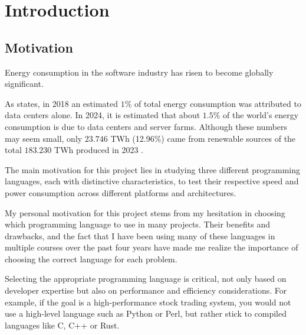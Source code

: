 \chapter{Introduction}\label{chap:introduction}



\section{Motivation}\label{sec:motivation}
Energy consumption in the software industry has risen to become globally significant. %

As \cite{recalibrating-datacenter} states, in 2018 an estimated $1\%$ of total energy consumption was attributed to data centers alone. In 2024, it is estimated that about $1.5\%$ of the world's energy consumption is due to data centers and server farms. Although these numbers may seem small, only $23.746$ TWh (12.96\%) came from renewable sources of the total $183.230$ TWh produced in 2023 \cite{energy-production-consumption}.


The main motivation for this project lies in studying three different programming languages, each with distinctive characteristics, to test their respective speed and power consumption across different platforms and architectures.

My personal motivation for this project stems from my hesitation in choosing which programming language to use in many projects. Their benefits and drawbacks, and the fact that I have been using many of these languages in multiple courses over the past four years have made me realize the importance of choosing the correct language for each problem.

Selecting the appropriate programming language is critical, not only based on developer expertise but also on performance and efficiency considerations. For example, if the goal is a high-performance stock trading system, you would not use a high-level language such as Python or Perl, but rather stick to compiled languages like C, C++ or Rust.


